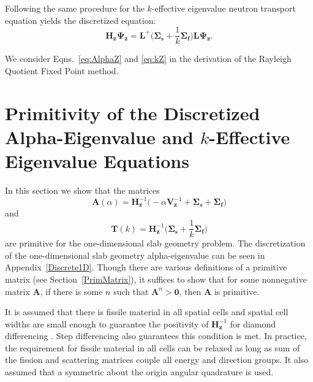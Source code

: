 Following the same procedure for the $k$-effective eigenvalue neutron transport equation yields the discretized equation:
\begin{equation}
	\boxed{\mathbf{H_{z}} \mathbf{\Psi_{z}} = \mathbf{L}^{+} \bigg ( \mathbf{\Sigma_{s}} + \frac{1}{k}\mathbf{\Sigma_{f}} \bigg ) \mathbf{L} \mathbf{\Psi_{z}}.}
	\label{eq:kZ}
\end{equation}

We consider Eqns.~\ref{eq:AlphaZ} and \ref{eq:kZ} in the derivation of the Rayleigh Quotient Fixed Point method.


%

\section{Primitivity of the Discretized Alpha-Eigenvalue and $k$-Effective Eigenvalue Equations}
\label{sec:PrimPos}

In this section we show that the matrices 
\begin{equation}
\mathbf{A}(\alpha) = \mathbf{H}_{\mathbf{z}}^{-1} \big (-\alpha \mathbf{V}_{\mathbf{z}}^{-1} + \mathbf{\Sigma_{s}} + \mathbf{\Sigma_{f}} \big)
\end{equation}
and
\begin{equation}
\mathbf{T}(k) = \mathbf{H}_{\mathbf{z}}^{-1} \bigg (\mathbf{\Sigma_{s}} + \frac{1}{k}\mathbf{\Sigma_{f}} \bigg)
\end{equation}
are primitive for the one-dimensional slab geometry problem. The discretization of the one-dimensional slab geometry alpha-eigenvalue can be seen in Appendix~\ref{Discrete1D}. Though there are various definitions of a primitive matrix (see Section~\ref{PrimMatrix}), it suffices to show that for some nonnegative matrix $\mathbf{A}$, if there is some $n$ such that $\mathbf{A}^{n} > \mathbf{0}$, then $\mathbf{A}$ is primitive.

It is assumed that there is fissile material in all spatial cells and spatial cell widths are small enough to guarantee the positivity of $\mathbf{H}_{\mathbf{z}}^{-1}$ for diamond differencing \cite{greenbaum1997iterative}. Step differencing also guarantees this condition is met. In practice, the requirement for fissile material in all cells can be relaxed as long as sum of the fission and scattering matrices couple all energy and direction groups. It also assumed that a symmetric about the origin angular quadrature is used.

